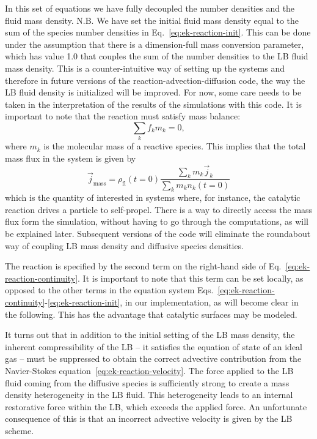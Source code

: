 In this set of equations we have fully decoupled the number densities and the
fluid mass density. N.B. We have set the initial fluid mass density equal to the
sum of the species number densities in Eq.~\eqref{eq:ek-reaction-init}. This can
be done under the assumption that there is a dimension-full mass conversion
parameter, which has value 1.0 that couples the sum of the number densities to 
the LB fluid mass density. This is a counter-intuitive way of setting up the 
systems and therefore in future versions of the reaction-advection-diffusion 
code, the way the LB fluid density is initialized will be improved. For now, 
some care needs to be taken in the interpretation of the results of the 
simulations with this code. It is important to note that the reaction must 
satisfy mass balance:
\begin{equation}
\label{eq:ek-mass-balance} \sum_{k} f_{k} m_{k} = 0 ,
\end{equation}
where $m_{k}$ is the molecular mass of a reactive species. This implies that the
total mass flux in the system is given by
\begin{equation}
\label{eq:ek-mass-flux} \vec{j}_{\mathrm{mass}} = \rho_{\mathrm{fl}}(t = 0) \frac{\sum_{k} m_{k} \vec{j}_{k}}{\sum_{k} m_{k} n_{k} (t = 0)}
\end{equation}
which is the quantity of interested in systems where, for instance, the
catalytic reaction drives a particle to self-propel. There is a way to directly 
access the mass flux form the simulation, without having to go through the
computations, as will be explained later. Subsequent versions of the code will
eliminate the roundabout way of coupling LB mass density and diffusive species
densities.

The reaction is specified by the second term on the right-hand side of 
Eq.~\eqref{eq:ek-reaction-continuity}. It is important to note that this term
can be set locally, as opposed to the other terms in the equation system 
Eqs.~\eqref{eq:ek-reaction-continuity}-\eqref{eq:ek-reaction-init}, in our 
implementation, as will become clear in the following. This has the
advantage that catalytic surfaces may be modeled. 

It turns out that in addition to the initial setting of the LB mass density, the
inherent compressibility of the LB -- it satisfies the equation of state of an 
ideal gas -- must be suppressed to obtain the correct advective contribution
from the Navier-Stokes equation~\eqref{eq:ek-reaction-velocity}. The force 
applied to the LB fluid coming from the diffusive species is sufficiently
strong to create a mass density heterogeneity in the LB fluid. This 
heterogeneity leads to an internal restorative force within the LB, which
exceeds the applied force. An unfortunate consequence of this is that an 
incorrect advective velocity is given by the LB scheme.

